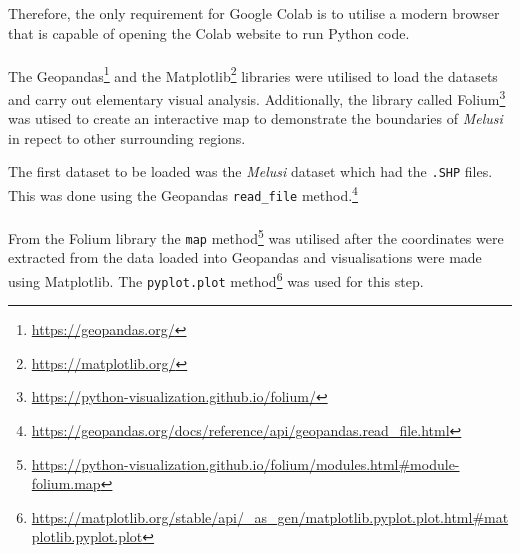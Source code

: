 Therefore, the only requirement for Google Colab is to utilise a modern browser that is capable of opening the Colab website to run Python code.
\\\\
The Geopandas\footnote{\url{https://geopandas.org/}} and the Matplotlib\footnote{\url{https://matplotlib.org/}} libraries were utilised to load the datasets and carry out elementary visual analysis. Additionally, the library called Folium\footnote{\url{https://python-visualization.github.io/folium/}} was utised to create an interactive map to demonstrate the boundaries of \textit{Melusi} in repect to other surrounding regions.

The first dataset to be loaded was the \textit{Melusi} dataset which had the \texttt{.SHP} files. This was done using the Geopandas \texttt{read\_file} method.\footnote{\url{https://geopandas.org/docs/reference/api/geopandas.read_file.html}}\\\\
From the Folium library the \texttt{map} method\footnote{\url{https://python-visualization.github.io/folium/modules.html\#module-folium.map}} was utilised after the coordinates were extracted from the data loaded into Geopandas and visualisations were made using Matplotlib. The \texttt{pyplot.plot} method\footnote{\url{https://matplotlib.org/stable/api/_as_gen/matplotlib.pyplot.plot.html\#matplotlib.pyplot.plot}} was used for this step.


